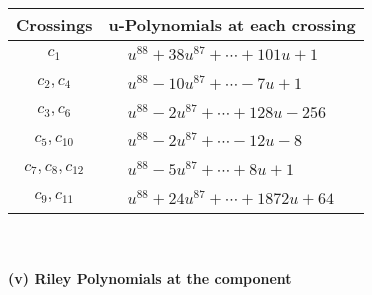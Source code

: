 \documentclass[1p]{elsarticle_modified}
\theoremstyle{definition}
\begin{document}
\begin{tabular}{m{50pt}|m{274pt}}
Crossings & \hspace{64pt}u-Polynomials at each crossing \\
\hline $$\begin{aligned}c_{1}\end{aligned}$$&$\begin{aligned}
&u^{88}+38 u^{87}+\cdots+101 u+1
\end{aligned}$\\
\hline $$\begin{aligned}c_{2},c_{4}\end{aligned}$$&$\begin{aligned}
&u^{88}-10 u^{87}+\cdots-7 u+1
\end{aligned}$\\
\hline $$\begin{aligned}c_{3},c_{6}\end{aligned}$$&$\begin{aligned}
&u^{88}-2 u^{87}+\cdots+128 u-256
\end{aligned}$\\
\hline $$\begin{aligned}c_{5},c_{10}\end{aligned}$$&$\begin{aligned}
&u^{88}-2 u^{87}+\cdots-12 u-8
\end{aligned}$\\
\hline $$\begin{aligned}c_{7},c_{8},c_{12}\end{aligned}$$&$\begin{aligned}
&u^{88}-5 u^{87}+\cdots+8 u+1
\end{aligned}$\\
\hline $$\begin{aligned}c_{9},c_{11}\end{aligned}$$&$\begin{aligned}
&u^{88}+24 u^{87}+\cdots+1872 u+64
\end{aligned}$\\
\hline
\end{tabular}\\~\\
\newpage\renewcommand{\arraystretch}{1}
\flushleft \textbf{(v) Riley Polynomials at the component}\newline \\
\end{document}
